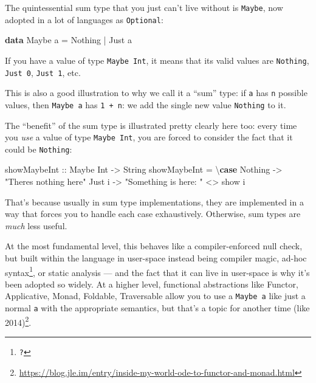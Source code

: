 \documentclass[]{article}
\newenvironment{Shaded}{}{}
\newcommand{\DataTypeTok}[1]{\textcolor[rgb]{0.56,0.13,0.00}{#1}}
\newcommand{\FunctionTok}[1]{\textcolor[rgb]{0.02,0.16,0.49}{#1}}
\newcommand{\KeywordTok}[1]{\textcolor[rgb]{0.00,0.44,0.13}{\textbf{#1}}}
\newcommand{\NormalTok}[1]{#1}
\newcommand{\OperatorTok}[1]{\textcolor[rgb]{0.40,0.40,0.40}{#1}}
\newcommand{\OtherTok}[1]{\textcolor[rgb]{0.00,0.44,0.13}{#1}}
\newcommand{\StringTok}[1]{\textcolor[rgb]{0.25,0.44,0.63}{#1}}
\renewcommand{\href}[2]{#2\footnote{\url{#1}}}
\begin{document}
The quintessential sum type that you just can't live without is \texttt{Maybe},
now adopted in a lot of languages as \texttt{Optional}:

\begin{Shaded}
\begin{Highlighting}[]
\KeywordTok{data} \DataTypeTok{Maybe}\NormalTok{ a }\OtherTok{=} \DataTypeTok{Nothing} \OperatorTok{|} \DataTypeTok{Just}\NormalTok{ a}
\end{Highlighting}
\end{Shaded}

If you have a value of type \texttt{Maybe\ Int}, it means that its valid values
are \texttt{Nothing}, \texttt{Just\ 0}, \texttt{Just\ 1}, etc.

This is also a good illustration to why we call it a ``sum'' type: if \texttt{a}
has \texttt{n} possible values, then \texttt{Maybe\ a} has \texttt{1\ +\ n}: we
add the single new value \texttt{Nothing} to it.

The ``benefit'' of the sum type is illustrated pretty clearly here too: every
time you \emph{use} a value of type \texttt{Maybe\ Int}, you are forced to
consider the fact that it could be \texttt{Nothing}:

\begin{Shaded}
\begin{Highlighting}[]
\OtherTok{showMaybeInt ::} \DataTypeTok{Maybe} \DataTypeTok{Int} \OtherTok{{-}\textgreater{}} \DataTypeTok{String}
\NormalTok{showMaybeInt }\OtherTok{=}\NormalTok{ \textbackslash{}}\KeywordTok{case}
  \DataTypeTok{Nothing} \OtherTok{{-}\textgreater{}} \StringTok{"There\textquotesingle{}s nothing here"}
  \DataTypeTok{Just}\NormalTok{ i }\OtherTok{{-}\textgreater{}} \StringTok{"Something is here: "} \OperatorTok{\textless{}\textgreater{}} \FunctionTok{show}\NormalTok{ i}
\end{Highlighting}
\end{Shaded}

That's because usually in sum type implementations, they are implemented in a
way that forces you to handle each case exhaustively. Otherwise, sum types are
\emph{much} less useful.

At the most fundamental level, this behaves like a compiler-enforced null check,
but built within the language in user-space instead being compiler magic, ad-hoc
syntax\footnote{\texttt{?}}, or static analysis --- and the fact that it can
live in user-space is why it's been adopted so widely. At a higher level,
functional abstractions like Functor, Applicative, Monad, Foldable, Traversable
allow you to use a \texttt{Maybe\ a} like just a normal \texttt{a} with the
appropriate semantics, but that's
\href{https://blog.jle.im/entry/inside-my-world-ode-to-functor-and-monad.html}{a
topic for another time (like 2014)}.
\end{document}
